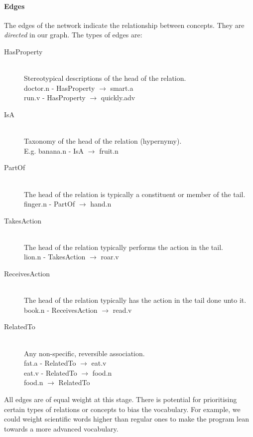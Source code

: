 \paragraph{Edges}
The edges of the network indicate the relationship between concepts. They are \textit{directed} in our graph. The types of edges are:
\begin{description}
\item[HasProperty] \hfill \\ Stereotypical descriptions of the head of the relation. \hfill \\ doctor.n - HasProperty $\rightarrow$ smart.a \hfill \\ run.v - HasProperty $\rightarrow$ quickly.adv
\item[IsA] \hfill \\ Taxonomy of the head of the relation (hypernymy). \hfill \\ E.g. banana.n - IsA $\rightarrow$ fruit.n
\item[PartOf] \hfill \\ The head of the relation is typically a constituent or member of the tail.  \hfill \\ finger.n - PartOf $\rightarrow$ hand.n
\item[TakesAction] \hfill \\The head of the relation typically performs the action in the tail. \hfill \\ lion.n - TakesAction $\rightarrow$ roar.v
\item[ReceivesAction] \hfill \\The head of the relation typically has the action in the tail done unto it. \hfill \\ book.n - ReceivesAction $\rightarrow$ read.v
\item[RelatedTo] \hfill \\ Any non-specific, reversible association. \hfill \\ fat.a - RelatedTo $\rightarrow$ eat.v \hfill \\ eat.v - RelatedTo $\rightarrow$ food.n \hfill \\ food.n $\rightarrow$ RelatedTo
\end{description}

All edges are of equal weight at this stage. There is potential for prioritising certain types of relations or concepts to bias the vocabulary. For example, we could weight scientific words higher than regular ones to make the program lean towards a more advanced vocabulary.



